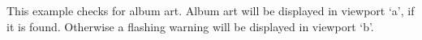\begin{example}
\end{example}
This example checks for album art. Album art will be displayed in viewport `a', if
it is found. Otherwise a flashing warning will be displayed in viewport `b'.
